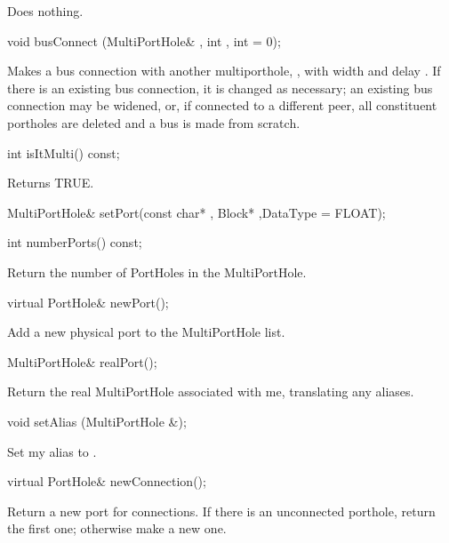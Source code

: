 Does nothing.

\begin{example}
void busConnect (MultiPortHole& , int , int  = 0);
\end{example}

Makes a bus connection with another multiporthole, , with
width  and delay .  If there is an existing bus
connection, it is changed as necessary; an existing bus connection may
be widened, or, if connected to a different peer, all constituent
portholes are deleted and a bus is made from scratch.

\begin{example}
int isItMulti() const;
\end{example}

Returns TRUE.

\begin{example}
MultiPortHole& setPort(const char* ,
                       Block* ,DataType  = FLOAT);
\end{example}

\begin{example}
int numberPorts() const;
\end{example}

Return the number of PortHoles in the MultiPortHole.

\begin{example}
virtual PortHole& newPort();
\end{example}

Add a new physical port to the MultiPortHole list.

\begin{example}
MultiPortHole& realPort();
\end{example}

Return the real MultiPortHole associated with me, translating any
aliases.

\begin{example}
void setAlias (MultiPortHole &);
\end{example}

Set my alias to .

\begin{example}
virtual PortHole& newConnection();
\end{example}

Return a new port for connections.  If there is an unconnected porthole,
return the first one; otherwise make a new one.

